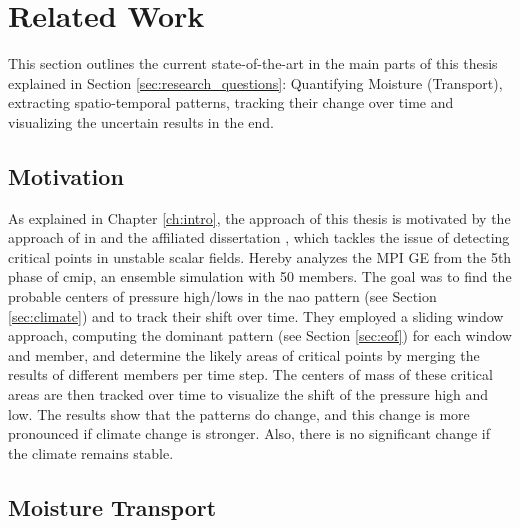 \chapter{Related Work}
\label{ch:related_work}

This section outlines the current state-of-the-art in the main parts of this thesis explained in Section \ref{sec:research_questions}: Quantifying Moisture (Transport), extracting spatio-temporal patterns, tracking their change over time and visualizing the uncertain results in the end.

\section{Motivation}

As explained in Chapter \ref{ch:intro}, the approach of this thesis is motivated by the approach of \citeauthor{vietinghoff_visual_2021} in \cite{vietinghoff_visual_2021} and the affiliated dissertation \cite{vietinghoffdiss}, which tackles the issue of detecting critical points in unstable scalar fields.
Hereby \cite{vietinghoff_visual_2021} analyzes the MPI GE \cite{maher_max_2019} from the 5th phase of \ac{cmip}, an ensemble simulation with 50 members. 
The goal was to find the probable centers of pressure high/lows in the \ac{nao} pattern (see Section \ref{sec:climate}) and to track their shift over time. 
They employed a sliding window approach, computing the dominant pattern (see Section \ref{sec:eof})  for each window and member, and determine the likely areas of critical points by merging the results of different members per time step. 
The centers of mass of these critical areas are then tracked over time to visualize the shift of the pressure high and low. 
The results show that the patterns do change, and this change is more pronounced if climate change is stronger. 
Also, there is no significant change if the climate remains stable.


\section{Moisture Transport}
\label{sec:moisture-transport}


